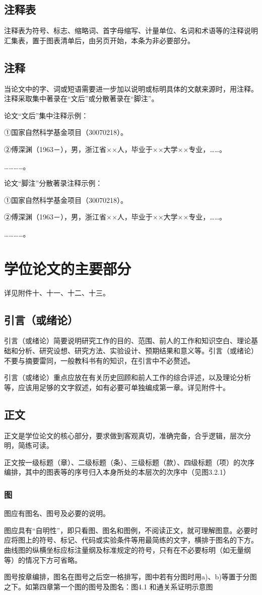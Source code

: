 \subsection{注释表}
注释表为符号、标志、缩略词、首字母缩写、计量单位、名词和术语等的注释说明汇集表，置于图表清单后，由另页开始，本条为非必要部分。

\subsection{注释}
当论文中的字、词或短语需要进一步加以说明或标明具体的文献来源时，用注释。注释采取集中著录在“文后”或分散著录在“脚注”。

论文“文后”集中注释示例：

①国家自然科学基金项目（30070218）。

②傅深渊（1963－），男，浙江省××人，毕业于××大学××专业，……。 

…………。

论文“脚注”分散著录注释示例：

①国家自然科学基金项目（30070218）。

②傅深渊（1963－），男，浙江省××人，毕业于××大学××专业，……。

…………。

\section{学位论文的主要部分}
详见附件十、十一、十二、十三。

\subsection{引言（或绪论）}
引言（或绪论）简要说明研究工作的目的、范围、前人的工作和知识空白、理论基础和分析、研究设想、研究方法、实验设计、预期结果和意义等。引言（或绪论）不要与摘要雷同，一般教科书有的知识，在引言中不必赘述。

引言（或绪论）重点应放在有关历史回顾和前人工作的综合评述，以及理论分析等，应该用足够的文字叙述，如有必要可单独编成第一章。详见附件十。

\subsection{正文}
正文是学位论文的核心部分，要求做到客观真切，准确完备，合乎逻辑，层次分明，简练可读。

正文按一级标题（章）、二级标题（条）、三级标题（款）、四级标题（项）的次序编排，其中的图表等的序号归入本身所处的本层次的次序中（见图3.2.1）

\subsubsection{图}
图应有图名、图号及必要的说明。

图应具有“自明性”，即只看图、图名和图例，不阅读正文，就可理解图意。必要时应将图上的符号、标记、代码或实验条件等用最简练的文字，横排于图名的下方。曲线图的纵横坐标应标注量纲及标准规定的符号，只有在不必要标明（如无量纲等）的情况下方可省略。

图号按章编排，图名在图号之后空一格排写，图中若有分图时用a)、b)等置于分图之下。如第四章第一个图的图号及图名：图4.1 和通关系证明示意图

